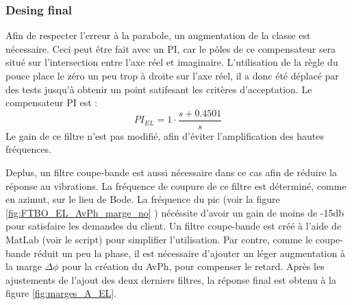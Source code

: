 \documentclass{udes_rapport} %
\begin{document}
\subsubsection{Desing final}
Afin de respecter l'erreur à la parabole, un augmentation de la classe est nécessaire. Ceci peut être fait avec un PI, car le pôles de ce compensateur sera situé sur l'intersection entre l'axe réel et imaginaire. L'utilisation de la règle du pouce place le zéro un peu trop à droite sur l'axe réel, il a donc été déplacé par des tests jusqu'à obtenir un point satifesant les critères d'acceptation. Le compensateur PI est :
\[PI_{EL} = 1 \cdot \frac{s+0.4501}{s}\]
Le gain de ce filtre n'est pas modifié, afin d'éviter l'amplification des hautes fréquences.

Deplus, un filtre coupe-bande est aussi nécessaire dans ce cas afin de réduire la réponse au vibrations. La fréquence de coupure de ce filtre est déterminé, comme en azimut, sur le lieu de Bode. La fréquence du pic (voir la figure \ref{fig:FTBO_EL_AvPh_marge_no} ) nécéssite d'avoir un gain de moins de -15db pour satisfaire les demandes du client. Un filtre coupe-bande est créé à l'aide de MatLab (voir le script) pour simplifier l'utilisation. Par contre, comme le coupe-bande réduit un peu la phase, il est nécessaire d'ajouter un léger augmentation à la marge $\Delta \phi$ pour la création du AvPh, pour compenser le retard.
Après les ajustements de l'ajout des deux derniers filtres, la réponse final est obtenu à la figure \ref{fig:marges_A_EL}.





\newpage
\end{document}
